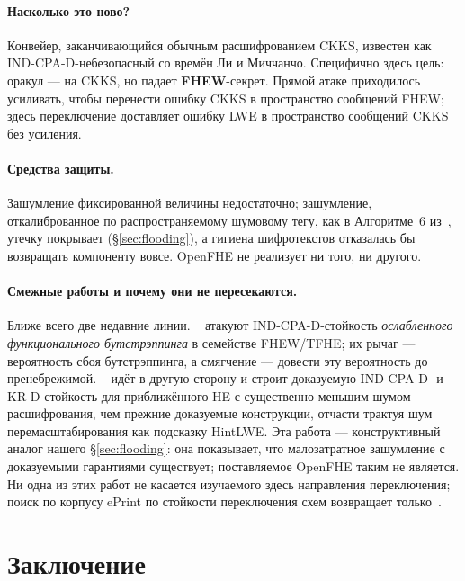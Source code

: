 \documentclass[11pt]{article}
\begin{document}
\paragraph{Насколько это ново?}
Конвейер, заканчивающийся обычным
расшифрованием CKKS, известен как IND-CPA-D-небезопасный со времён Ли и Миччанчо. Специфично здесь
цель: оракул --- на CKKS, но падает \textbf{FHEW}-секрет. Прямой атаке приходилось усиливать, чтобы перенести ошибку CKKS в пространство
сообщений FHEW; здесь переключение доставляет ошибку LWE в пространство сообщений CKKS без усиления.

\paragraph{Средства защиты.}
Зашумление фиксированной величины недостаточно; зашумление, откалиброванное по распространяемому шумовому тегу,
как в Алгоритме~6 из~\cite{santato2026}, утечку покрывает (\S\ref{sec:flooding}), а гигиена
шифротекстов отказалась бы возвращать компоненту вовсе. OpenFHE не реализует ни
того, ни другого.

\paragraph{Смежные работы и почему они не пересекаются.}
Ближе всего две недавние линии. \citeauthor{liu2025}~\cite{liu2025} атакуют IND-CPA-D-стойкость
\emph{ослабленного функционального бутстрэппинга} в семействе FHEW/TFHE; их рычаг --- вероятность
сбоя бутстрэппинга, а смягчение --- довести эту вероятность до пренебрежимой.
\citeauthor{ogilvie2025}~\cite{ogilvie2025} идёт в другую сторону и строит доказуемую
IND-CPA-D- и KR-D-стойкость для приближённого HE с существенно меньшим шумом расшифрования, чем
прежние доказуемые конструкции, отчасти трактуя шум перемасштабирования как подсказку HintLWE. Эта
работа --- конструктивный аналог нашего \S\ref{sec:flooding}: она показывает, что
малозатратное зашумление с доказуемыми гарантиями существует; поставляемое OpenFHE таким не является. Ни одна из этих работ не касается
изучаемого здесь направления переключения; поиск по
корпусу ePrint по стойкости переключения схем возвращает только~\cite{santato2026}.

\section{Заключение}
\end{document}
